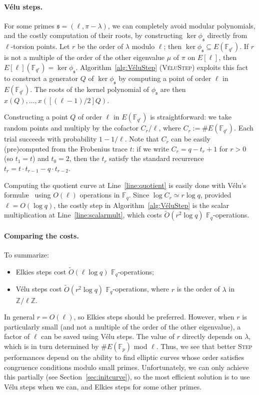\documentclass{llncs}
\newcommand{\F}{\mathbb{F}}
\newcommand{\Z}{\mathbb{Z}}
\newcommand{\softO}{\tilde{O}}
\newcommand{\algstyle}[1]{\textsc{#1}}
\renewcommand{\frak}{\mathfrak}
\begin{document}
\paragraph{Vélu steps.}

For some primes $\frak{s} = (\ell,\pi-\lambda)$,
we can completely avoid modular polynomials,
and the costly computation of their roots,
by constructing $\ker\phi_{\frak{s}}$ directly from $\ell$-torsion points.
Let $r$ be the order of $\lambda$ modulo $\ell$;
then $\ker\phi_{\frak s} \subseteq E(\F_{q^r})$.
If $r$ is not a multiple of the order of the other eigenvalue $\mu$
of $\pi$ on $E[\ell]$,
then $E[\ell](\F_{q^r}) = \ker\phi_{\frak s}$.
Algorithm~\ref{alg:VéluStep} (\algstyle{VéluStep}) 
exploits this fact to construct a generator $Q$ of $\ker\phi_{\frak s}$
by computing a point of order $\ell$ in $E(\F_{q^r})$.
The roots of the kernel polynomial of $\phi_{\frak s}$
are then $x(Q), \ldots, x([(\ell-1)/2]Q)$.

Constructing a point $Q$ of order $\ell$ in $E(\F_{q^r})$
is straightforward:
we take random points and multiply by the cofactor $C_r/\ell$,
where $C_r := \#E(\F_{q^r})$.
Each trial succeeds with probability $1 - 1/\ell$.
Note that $C_r$ can be easily (pre)computed from the Frobenius trace $t$:
if we write $C_r = q - t_r + 1$ for 
$r > 0$ (so $t_1 = t$) and $t_0 = 2$,
then the $t_r$ satisfy the standard recurrence
$t_r = t\cdot t_{r-1} - q\cdot t_{r-2}$. 

Computing the quotient curve at Line~\ref{line:quotient} is easily done
with Vélu's formul\ae~\cite{Velu71} using $O(\ell)$ operations in $\F_q$.
Since $\log C_r\simeq r\log q$, provided $\ell = O(\log q)$,
the costly step in Algorithm~\ref{alg:VéluStep} is the scalar
multiplication at Line~\ref{line:scalarmult}, which costs
$\softO(r^2\log q)$ $\F_q$-operations.

\paragraph{Comparing the costs.}
To summarize:
\begin{itemize}
\item Elkies steps cost $\softO(\ell\log q)$ $\F_q$-operations;
\item Vélu steps cost $\softO(r^2\log q)$ $\F_q$-operations,
    where $r$ is the order of $\lambda$ in $\Z/\ell\Z$.
\end{itemize}
In general $r = O(\ell)$, so Elkies steps should be preferred. 
However, when $r$ is particularly small
(and not a multiple of the order of the other eigenvalue),
a factor of $\ell$ can be saved using Vélu steps.
The value of $r$ directly depends on $\lambda$, which is in turn determined by
$\#E(\F_p)$ mod $\ell$. Thus, we see that better \algstyle{Step} performances
depend on the ability to find elliptic curves whose order
satisfies congruence conditions modulo small primes.
Unfortunately, we can only achieve this partially
(see Section~\ref{sec:initcurve}), so the most efficient solution is
to use Vélu steps when we can, and Elkies steps for some other primes.
\end{document}
